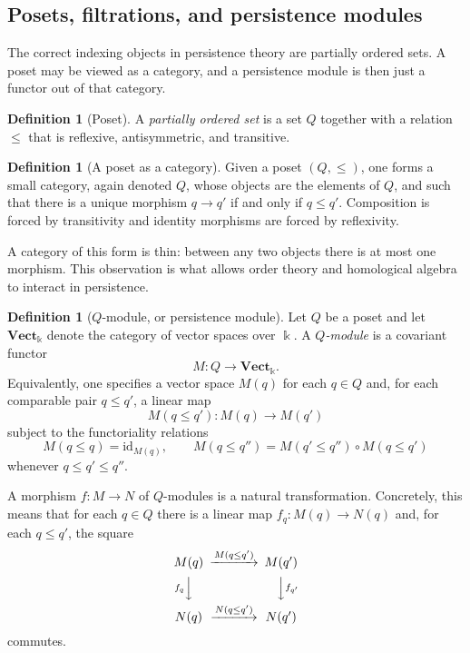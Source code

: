 \documentclass[11pt]{article}
\newcommand{\kk}{\Bbbk}
\theoremstyle{definition}
\newtheorem{defn}[theorem]{Definition}
\theoremstyle{remark}
\begin{document}
\subsection{Posets, filtrations, and persistence modules}

The correct indexing objects in persistence theory are partially ordered sets. A poset may be viewed as a category, and a persistence module is then just a functor out of that category.

\begin{defn}[Poset]
A \emph{partially ordered set} is a set $Q$ together with a relation $\leq$ that is reflexive, antisymmetric, and transitive.
\end{defn}

\begin{defn}[A poset as a category]
Given a poset $(Q,\leq)$, one forms a small category, again denoted $Q$, whose objects are the elements of $Q$, and such that there is a unique morphism $q \to q'$ if and only if $q \leq q'$. Composition is forced by transitivity and identity morphisms are forced by reflexivity.
\end{defn}

A category of this form is thin: between any two objects there is at most one morphism. This observation is what allows order theory and homological algebra to interact in persistence.

\begin{defn}[$Q$-module, or persistence module]
Let $Q$ be a poset and let $\mathbf{Vect}_{\kk}$ denote the category of vector spaces over $\kk$. A \emph{$Q$-module} is a covariant functor
\[
M : Q \longrightarrow \mathbf{Vect}_{\kk}.
\]
Equivalently, one specifies a vector space $M(q)$ for each $q \in Q$ and, for each comparable pair $q \leq q'$, a linear map
\[
M(q \leq q') : M(q) \to M(q')
\]
subject to the functoriality relations
\[
M(q \leq q)=\mathrm{id}_{M(q)}, \qquad
M(q \leq q'') = M(q' \leq q'') \circ M(q \leq q')
\]
whenever $q \leq q' \leq q''$.
\end{defn}

A morphism $f : M \to N$ of $Q$-modules is a natural transformation. Concretely, this means that for each $q \in Q$ there is a linear map $f_q : M(q) \to N(q)$ and, for each $q \leq q'$, the square
\[
\begin{CD}
M(q) @>{M(q\leq q')}>> M(q')\\
@V{f_q}VV @VV{f_{q'}}V\\
N(q) @>{N(q\leq q')}>> N(q')
\end{CD}
\]
commutes.
\end{document}
